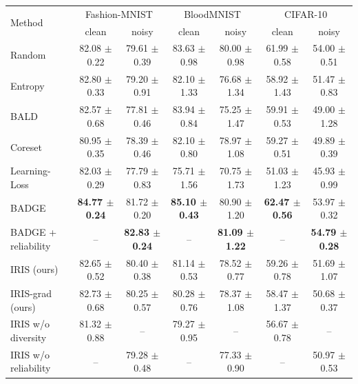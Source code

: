 \begin{tabular}{@{}lcccccc@{}}
\toprule
\multirow{2}{*}{Method} & \multicolumn{2}{c}{Fashion-MNIST} & \multicolumn{2}{c}{BloodMNIST} & \multicolumn{2}{c}{CIFAR-10} \\
 & clean & noisy & clean & noisy & clean & noisy \\
\midrule
Random & 82.08 $\pm$ 0.22 & 79.61 $\pm$ 0.39 & 83.63 $\pm$ 0.98 & 80.00 $\pm$ 0.98 & 61.99 $\pm$ 0.58 & 54.00 $\pm$ 0.51 \\
Entropy & 82.80 $\pm$ 0.33 & 79.20 $\pm$ 0.91 & 82.10 $\pm$ 1.33 & 76.68 $\pm$ 1.34 & 58.92 $\pm$ 1.43 & 51.47 $\pm$ 0.83 \\
BALD & 82.57 $\pm$ 0.68 & 77.81 $\pm$ 0.46 & 83.94 $\pm$ 0.84 & 75.25 $\pm$ 1.47 & 59.91 $\pm$ 0.53 & 49.00 $\pm$ 1.28 \\
Coreset & 80.95 $\pm$ 0.35 & 78.39 $\pm$ 0.46 & 82.10 $\pm$ 0.80 & 78.97 $\pm$ 1.08 & 59.27 $\pm$ 0.51 & 49.89 $\pm$ 0.39 \\
Learning-Loss & 82.03 $\pm$ 0.29 & 77.79 $\pm$ 0.83 & 75.71 $\pm$ 1.56 & 70.75 $\pm$ 1.73 & 51.03 $\pm$ 1.23 & 45.93 $\pm$ 0.99 \\
BADGE & \textbf{84.77 $\pm$ 0.24} & 81.72 $\pm$ 0.20 & \textbf{85.10 $\pm$ 0.43} & 80.90 $\pm$ 1.20 & \textbf{62.47 $\pm$ 0.56} & 53.97 $\pm$ 0.32 \\
BADGE + reliability & -- & \textbf{82.83 $\pm$ 0.24} & -- & \textbf{81.09 $\pm$ 1.22} & -- & \textbf{54.79 $\pm$ 0.28} \\
\midrule
IRIS (ours) & 82.65 $\pm$ 0.52 & 80.40 $\pm$ 0.38 & 81.14 $\pm$ 0.53 & 78.52 $\pm$ 0.77 & 59.26 $\pm$ 0.78 & 51.69 $\pm$ 1.07 \\
IRIS-grad (ours) & 82.73 $\pm$ 0.68 & 80.25 $\pm$ 0.57 & 80.28 $\pm$ 0.76 & 78.37 $\pm$ 1.08 & 58.47 $\pm$ 1.37 & 50.68 $\pm$ 0.37 \\
IRIS w/o diversity & 81.32 $\pm$ 0.88 & -- & 79.27 $\pm$ 0.95 & -- & 56.67 $\pm$ 0.78 & -- \\
IRIS w/o reliability & -- & 79.28 $\pm$ 0.48 & -- & 77.33 $\pm$ 0.90 & -- & 50.97 $\pm$ 0.53 \\
\bottomrule
\end{tabular}

